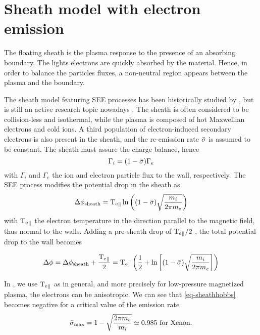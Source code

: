 
\section{Sheath model with electron emission}
  \label{sec-sheath}
    
  The floating sheath is the plasma response to the presence of an absorbing boundary.
  The lights electrons are quickly absorbed by the material.
  Hence, in order to balance the particles fluxes, a non-neutral region appears between the plasma and the boundary.
  
  
  The sheath model featuring SEE processes has been historically studied by \citet{hobbs1967}, but is still an active research topic nowadays \citep{ahedo2005}.
  The sheath is often considered to be collision-less and isothermal, while the plasma is composed of hot Maxwellian electrons and cold ions. A third population of electron-induced secondary electrons is also present in the sheath, and the re-emission rate $ \bar{\sigma }$ is assumed to be constant.
  The sheath must assure the charge balance, hence
  \begin{equation} \label{eq-sheath_SEE}
    \Gamma_i = ( 1 -  \bar{\sigma }) \Gamma_e
  \end{equation}
  with $\Gamma_i$ and $\Gamma_e$ the ion and electron particle flux to the wall, respectively.
  The SEE process modifies the potential drop in the sheath as \citep{hobbs1967}
  \begin{equation} \label{eq-sheathhobbs}
    \Delta \phi_{\rm sheath} = \mathrm{T_e}_{\parallel} \ln \left( (1 -  \bar{\sigma }) \sqrt{\frac{m_i}{2 \pi m_e}}   \right)
  \end{equation}
  with $\mathrm{T_e}_{\parallel}$ the electron temperature in the direction parallel to the magnetic field, thus normal to the walls.
  Adding a pre-sheath drop of $\mathrm{T_e}_{\parallel}/2$ \citep{ahedo2002}, the total potential drop to the wall becomes
  
  \begin{equation} \label{eq-total_drop}
    \Delta \phi = \Delta \phi_{\rm sheath} + \frac{\mathrm{T_e}_{\parallel}}{2} =  \mathrm{T_e}_{\parallel} \left( \frac{1}{2} + \ln \left[ (1 -  \bar{\sigma }) \sqrt{\frac{m_i}{2 \pi m_e}}   \right]  \right)
  \end{equation}
  
  In , we use $\mathrm{T_e}_{\parallel}$ as in general, and more precisely for low-pressure magnetized plasma, the electrons can be anisotropic.
  We can see that \cref{eq-sheathhobbs} becomes negative for a critical value of the emission rate
  \begin{equation} \label{eq-ratecrone}
     \bar{\sigma }_{\rm max} = 1 - \sqrt{\frac{2 \pi m_e}{m_i}} \simeq 0.985 \text{ for Xenon.}
  \end{equation}
  
